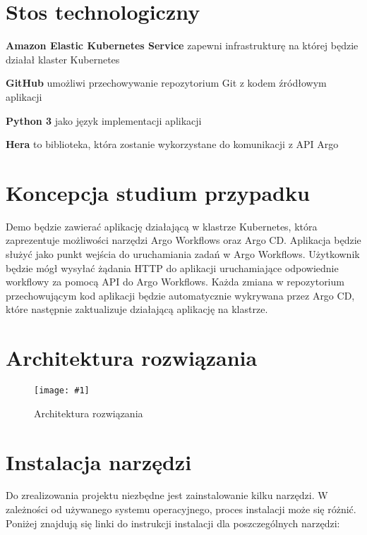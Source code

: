 \documentclass{article}
\newcommand{\img}[4]{
    \begin{figure}[!htbp]
    \centering
    \texttt{[image: \#1]}
    \caption{#2}
    \label{#3}
    \end{figure}
}
\begin{document}
\section{Stos technologiczny}
\begin{description}
\item{\textbf{Amazon Elastic Kubernetes Service}\cite{aws-eks}} zapewni infrastrukturę na której będzie działał klaster Kubernetes

\item{\textbf{GitHub}\cite{github}} umożliwi przechowywanie repozytorium Git z kodem źródłowym aplikacji

\item{\textbf{Python 3}\cite{python}} jako język implementacji aplikacji

\item{\textbf{Hera}\cite{hera}} to biblioteka, która zostanie wykorzystane do komunikacji z API Argo
\end{description}


\section{Koncepcja studium przypadku}
Demo będzie zawierać aplikację działającą w klastrze Kubernetes, która zaprezentuje możliwości narzędzi Argo Workflows oraz Argo CD. 
Aplikacja będzie służyć jako punkt wejścia do uruchamiania zadań w Argo Workflows. 
Użytkownik będzie mógł wysyłać żądania HTTP do aplikacji uruchamiające odpowiednie workflowy za pomocą API do Argo Workflows. 
Każda zmiana w repozytorium przechowującym kod aplikacji będzie automatycznie wykrywana przez Argo CD, które następnie zaktualizuje działającą aplikację na klastrze.


\section{Architektura rozwiązania}
\img{img/suu_env_conf.drawio.png}{Architektura rozwiązania}{fig:env-conf}{1}


\section{Instalacja narzędzi}
Do zrealizowania projektu niezbędne jest zainstalowanie kilku narzędzi. W zależności od używanego systemu operacyjnego, proces instalacji może się różnić. Poniżej znajdują się linki do instrukcji instalacji dla poszczególnych narzędzi:
\end{document}

